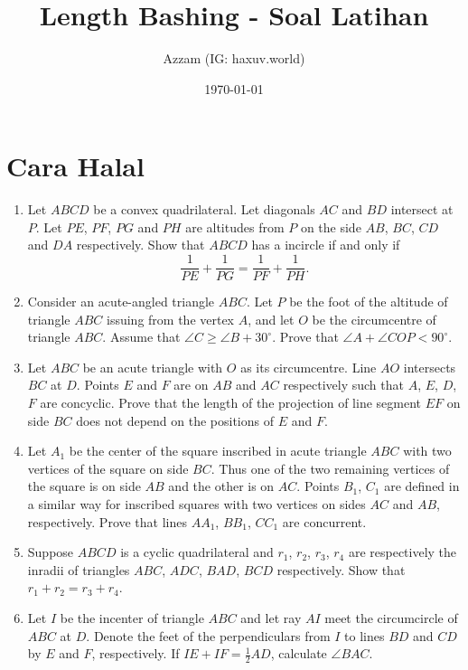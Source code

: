 \documentclass[11pt]{scrartcl}
\title{Length Bashing - Soal Latihan}
\author{Azzam (IG: haxuv.world)}
\date{\today}
\begin{document}
\maketitle
\section{Cara Halal}
\begin{enumerate}
    \item Let $ABCD$ be a convex quadrilateral. Let diagonals $AC$ and $BD$ intersect at $P$. Let $PE$, $PF$, $PG$ and $PH$ are altitudes from $P$ on the side $AB$, $BC$, $CD$ and $DA$ respectively. Show that $ABCD$ has a incircle if and only if
    $$\dfrac{1}{PE}+\dfrac{1}{PG}=\dfrac{1}{PF}+\dfrac{1}{PH}.$$

    \item Consider an acute-angled triangle $ABC$. Let $P$ be the foot of the altitude of triangle $ABC$ issuing from the vertex $A$, and let $O$ be the circumcentre of triangle $ABC$. Assume that $\angle C \geq \angle B + 30^\circ$. Prove that $\angle A + \angle COP < 90^\circ$.

    \item Let $ABC$ be an acute triangle with $O$ as its circumcentre. Line $AO$ intersects $BC$ at $D$. Points $E$ and $F$ are on $AB$ and $AC$ respectively such that $A$, $E$, $D$, $F$ are concyclic. Prove that the length of the projection of line segment $EF$ on side $BC$ does not depend on the positions of $E$ and $F$.

    \item Let $A_1$ be the center of the square inscribed in acute triangle $ABC$ with two vertices of the square on side $BC$. Thus one of the two remaining vertices of the square is on side $AB$ and the other is on $AC$. Points $B_1$, $C_1$ are defined in a similar way for inscribed squares with two vertices on sides $AC$ and $AB$, respectively. Prove that lines $AA_1$, $BB_1$, $CC_1$ are concurrent.

    \item Suppose $ABCD$ is a cyclic quadrilateral and $r_1$, $r_2$, $r_3$, $r_4$ are respectively the inradii of triangles $ABC$, $ADC$, $BAD$, $BCD$ respectively. Show that $r_1 + r_2 = r_3 + r_4$.


    \item Let $I$ be the incenter of triangle $ABC$ and let ray $AI$ meet the circumcircle of $ABC$ at $D$. Denote the feet of the perpendiculars from $I$ to lines $BD$ and $CD$ by $E$ and $F$, respectively. If $IE + IF = \frac{1}{2} AD$, calculate $\angle BAC$.


\end{enumerate}
\end{document}
